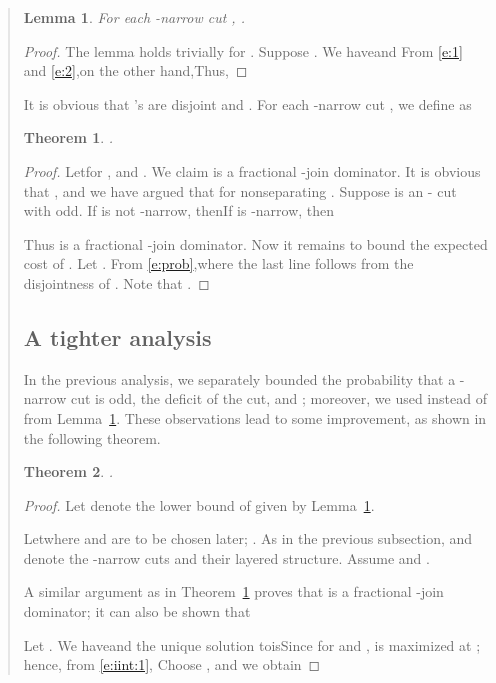 \documentclass[11pt,letterpaper]{article}
\newtheorem{lemma}{Lemma}
\newtheorem{thm}{Theorem}
\newcommand{\st}{\mbox{-} }
\begin{document}
\begin{quote}
\begin{lemma}\label{l:largedisjoint}
For each -narrow cut , .
\end{lemma}
\begin{proof}
The lemma holds trivially for . Suppose . We haveand
From \eqref{e:1} and \eqref{e:2},on the other hand,Thus,
\end{proof}

It is obvious that 's are disjoint and . For each -narrow cut , we define  as

\begin{thm}\label{t:qi}
.
\end{thm}
\begin{proof}
Letfor ,  and . We claim  is a fractional -join dominator. It is obvious that , and we have argued that  for nonseparating . Suppose  is an \st cut with  odd. If  is not -narrow, thenIf  is -narrow, then

Thus  is a fractional -join dominator. Now it remains to bound the expected cost of . Let . From \eqref{e:prob},where the last line follows from the disjointness of . Note that .
\end{proof}

\subsection{A tighter analysis}

In the previous analysis, we separately bounded the probability that a -narrow cut is odd, the deficit of the cut, and ; moreover, we used  instead of  from Lemma~\ref{l:largedisjoint}. These observations lead to some improvement, as shown in the following theorem.

\begin{thm}\label{t:iint}
.
\end{thm}
\begin{proof}
Let  denote the lower bound of  given by Lemma~\ref{l:largedisjoint}.

Letwhere  and  are to be chosen later; . As in the previous subsection,  and  denote the -narrow cuts and their layered structure. Assume  and .

A similar argument as in Theorem~\ref{t:qi} proves that  is a fractional -join dominator; it can also be shown that

Let . We haveand the unique solution toisSince  for  and ,  is maximized at ; hence, from \eqref{e:iint:1},
Choose ,  and we obtain
\end{proof}


\end{quote}
\end{document}
